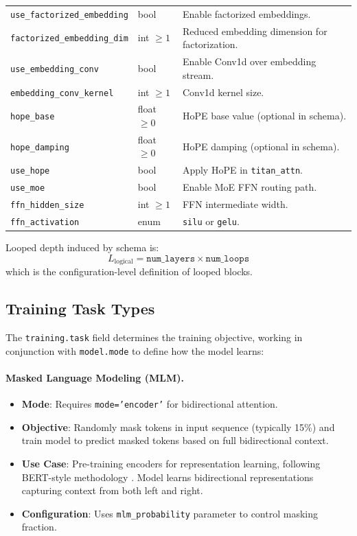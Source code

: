 \documentclass[11pt,a4paper]{article}
\begin{document}
\begin{longtable}{p{5.1cm}p{2.4cm}p{7.0cm}}
\texttt{use\_factorized\_embedding} & bool & Enable factorized embeddings. \\
\texttt{factorized\_embedding\_dim} & int $\ge 1$ & Reduced embedding dimension for factorization. \\
\texttt{use\_embedding\_conv} & bool & Enable Conv1d over embedding stream. \\
\texttt{embedding\_conv\_kernel} & int $\ge 1$ & Conv1d kernel size. \\
\texttt{hope\_base} & float $\ge 0$ & HoPE base value (optional in schema). \\
\texttt{hope\_damping} & float $\ge 0$ & HoPE damping (optional in schema). \\
\texttt{use\_hope} & bool & Apply HoPE in \texttt{titan\_attn}. \\
\texttt{use\_moe} & bool & Enable MoE FFN routing path. \\
\texttt{ffn\_hidden\_size} & int $\ge 1$ & FFN intermediate width. \\
\texttt{ffn\_activation} & enum & \texttt{silu} or \texttt{gelu}. \\
\bottomrule
\end{longtable}
\normalsize

Looped depth induced by schema is:
\[
L_{\text{logical}} = \texttt{num\_layers} \times \texttt{num\_loops}
\]
which is the configuration-level definition of looped blocks.

\subsection{Training Task Types}

The \texttt{training.task} field determines the training objective, working in conjunction with \texttt{model.mode} to define how the model learns:

\paragraph{Masked Language Modeling (MLM).}
\begin{itemize}[leftmargin=*]
    \item \textbf{Mode}: Requires \texttt{mode='encoder'} for bidirectional attention.
    \item \textbf{Objective}: Randomly mask tokens in input sequence (typically 15\%) and train model to predict masked tokens based on full bidirectional context.
    \item \textbf{Use Case}: Pre-training encoders for representation learning, following BERT-style methodology \citep{devlin_bert_2019}. Model learns bidirectional representations capturing context from both left and right.
    \item \textbf{Configuration}: Uses \texttt{mlm\_probability} parameter to control masking fraction.
\end{itemize}
\end{document}
